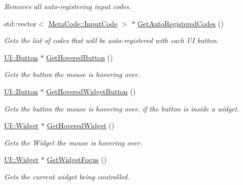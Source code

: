 \begin{DoxyCompactItemize}
\begin{DoxyCompactList}\small\item\em Removes all auto-\/registering input codes. \item\end{DoxyCompactList}\item 
std::vector$<$ \hyperlink{classphys_1_1MetaCode_a3e501cbb5bf0f6f1fdb7211465bda8d8}{MetaCode::InputCode} $>$ $\ast$ \hyperlink{classphys_1_1UIManager_a4ba0a6ae3044fb70aeece69fd5befbf9}{GetAutoRegisteredCodes} ()
\begin{DoxyCompactList}\small\item\em Gets the list of codes that will be auto-\/registered with each UI button. \item\end{DoxyCompactList}\item 
\hyperlink{classphys_1_1UI_1_1Button}{UI::Button} $\ast$ \hyperlink{classphys_1_1UIManager_acd08dba5be95182a6c923ed698822277}{GetHoveredButton} ()
\begin{DoxyCompactList}\small\item\em Gets the button the mouse is hovering over. \item\end{DoxyCompactList}\item 
\hyperlink{classphys_1_1UI_1_1Button}{UI::Button} $\ast$ \hyperlink{classphys_1_1UIManager_a1dbcd08fc03131de3f68521a3d877071}{GetHoveredWidgetButton} ()
\begin{DoxyCompactList}\small\item\em Gets the button the mouse is hovering over, if the button is inside a widget. \item\end{DoxyCompactList}\item 
\hyperlink{classphys_1_1UI_1_1Widget}{UI::Widget} $\ast$ \hyperlink{classphys_1_1UIManager_a5772b611b6881eb98932f4b400b44d09}{GetHoveredWidget} ()
\begin{DoxyCompactList}\small\item\em Gets the Widget the mouse is hovering over. \item\end{DoxyCompactList}\item 
\hyperlink{classphys_1_1UI_1_1Widget}{UI::Widget} $\ast$ \hyperlink{classphys_1_1UIManager_a99694297814d2e82ec507c6f4d6bec1a}{GetWidgetFocus} ()
\begin{DoxyCompactList}\small\item\em Gets the current widget being controlled. \item\end{DoxyCompactList}\item 

\end{DoxyCompactItemize}
